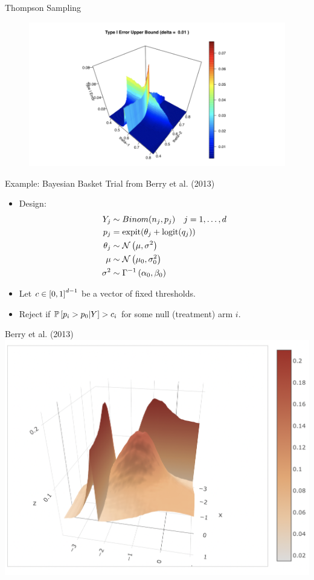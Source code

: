 \begin{frame}{Thompson Sampling}
\begin{figure}
    \centering
    \includegraphics[width=\textwidth]{figures/thompson-sampling.png}
\end{figure}
\end{frame}

\begin{frame}{Example: Bayesian Basket Trial from Berry et al. (2013)}
\begin{itemize}
    \item Design:
        \begin{align*}
            Y_j &\sim Binom(n_j, p_j) \quad j=1,\ldots, d \\
            p_j &= \operatorname{expit}(\theta_j + \operatorname{logit}(q_j)) \\
            \theta_j &\sim \mathcal{N}\left( \mu, \sigma^2 \right) \\
            \mu &\sim \mathcal{N}\left( \mu_0, \sigma_0^2 \right) \\
            \sigma^2 &\sim \Gamma^{-1}\left( \alpha_0, \beta_0 \right)
        \end{align*}
    \item Let $c \in \left[0,1\right]^{d-1}$ be a vector of fixed thresholds.
    \item Reject if $\mathbb{P}\left[p_i > p_0 | Y\right] > c_i$ for some null (treatment) arm $i$.
\end{itemize}
\end{frame}

\begin{frame}{Berry et al. (2013)}
\centering
\includegraphics[width=\textwidth]{figures/berry.png}
\end{frame}
